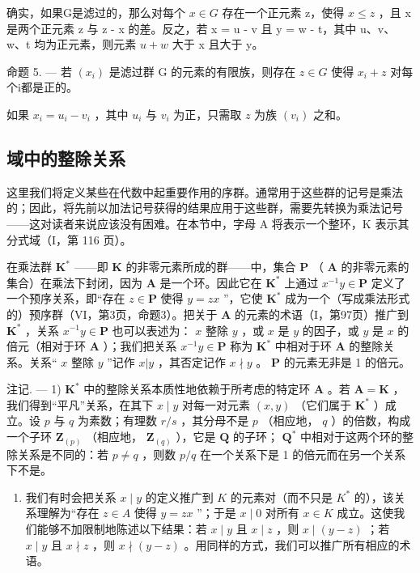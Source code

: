 确实，如果G是滤过的，那么对每个 \(x \in G\) 存在一个正元素 z，使得 \(x \leqslant z\) ，且 x 是两个正元素 z 与 z - x 的差。反之，若 x = u - v 且 y = w - t，其中 u、v、w、t 均为正元素，则元素 \(u + w\) 大于 x 且大于 y。

命题 5. --- 若 \((x_i)\) 是滤过群 G 的元素的有限族，则存在 \(z \in G\) 使得 \(x_i + z\) 对每个i都是正的。

如果 \(x_{i} = u_{i} - v_{i}\) ，其中 \(u_{i}\) 与 \(v_{i}\) 为正，只需取 \(z\) 为族 \((v_{i})\) 之和。

\subsection{域中的整除关系}

这里我们将定义某些在代数中起重要作用的序群。通常用于这些群的记号是乘法的；因此，将先前以加法记号获得的结果应用于这些群，需要先转换为乘法记号——这对读者来说应该没有困难。在本节中，字母 A 将表示一个整环，K 表示其分式域（I，第 116 页）。

在乘法群 \(\mathbf{K}^*\) ——即 \(\mathbf{K}\) 的非零元素所成的群——中，集合 \(\mathbf{P}\) （ \(\mathbf{A}\) 的非零元素的集合）在乘法下封闭，因为 \(\mathbf{A}\) 是一个环。因此它在 \(\mathbf{K}^*\) 上通过 \(x^{-1}y\in \mathbf{P}\) 定义了一个预序关系，即“存在 \(z\in \mathbf{P}\) 使得 \(y = zx\) ”，它使 \(\mathbf{K}^*\) 成为一个（写成乘法形式的）预序群（VI，第3页，命题3）。把关于 \(\mathbf{A}\) 的元素的术语（I，第97页）推广到 \(\mathbf{K}^*\) ，关系 \(x^{-1}y\in \mathbf{P}\) 也可以表述为： \(x\) 整除 \(y\) ，或 \(x\) 是 \(y\) 的因子，或 \(y\) 是 \(x\) 的倍元（相对于环 \(\mathbf{A}\) ）；我们把关系 \(x^{-1}y\in \mathbf{P}\) 称为 \(\mathbf{K}^*\) 中相对于环 \(\mathbf{A}\) 的整除关系。关系“ \(x\) 整除 \(y\) ”记作 \(x|y\) ，其否定记作 \(x\nmid y\) 。 \(\mathbf{P}\) 的元素无非是 1 的倍元。

注记. --- 1) \(\mathbf{K}^*\) 中的整除关系本质性地依赖于所考虑的特定环 \(\mathbf{A}\) 。若 \(\mathbf{A} = \mathbf{K}\) ，我们得到“平凡”关系，在其下 \(x \mid y\) 对每一对元素 \((x, y)\) （它们属于 \(\mathbf{K}^*\) ）成立。设 \(p\) 与 \(q\) 为素数；有理数 \(r/s\) ，其分母不是 \(p\) （相应地， \(q\) ）的倍数，构成一个子环 \(\mathbf{Z}_{(p)}\) （相应地， \(\mathbf{Z}_{(q)}\) ），它是 \(\mathbf{Q}\) 的子环； \(\mathbf{Q}^*\) 中相对于这两个环的整除关系是不同的：若 \(p \neq q\) ，则数 \(p/q\) 在一个关系下是 1 的倍元而在另一个关系下不是。

\begin{enumerate}
\def\labelenumi{\arabic{enumi})}
\setcounter{enumi}{1}
\tightlist
\item
  我们有时会把关系 \(x \mid y\) 的定义推广到 \(K\) 的元素对（而不只是 \(K^*\) 的），该关系理解为“存在 \(z \in A\) 使得 \(y = zx\) ”；于是 \(x \mid 0\) 对所有 \(x \in K\) 成立。这使我们能够不加限制地陈述以下结果：若 \(x \mid y\) 且 \(x \mid z\) ，则 \(x \mid (y - z)\) ；若 \(x \mid y\) 且 \(x \nmid z\) ，则 \(x \nmid (y - z)\) 。用同样的方式，我们可以推广所有相应的术语。
\end{enumerate}


